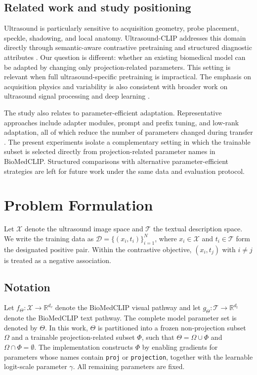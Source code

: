 \documentclass[runningheads]{llncs}
\begin{document}
\subsection{Related work and study positioning}

Ultrasound is particularly sensitive to acquisition geometry, probe placement, speckle, shadowing, and local anatomy. Ultrasound-CLIP addresses this domain directly through semantic-aware contrastive pretraining and structured diagnostic attributes \cite{jin2026usclip}. Our question is different: whether an existing biomedical model can be adapted by changing only projection-related parameters. This setting is relevant when full ultrasound-specific pretraining is impractical. The emphasis on acquisition physics and variability is also consistent with broader work on ultrasound signal processing and deep learning \cite{luijten2022ultrasound}.

The study also relates to parameter-efficient adaptation. Representative approaches include adapter modules, prompt and prefix tuning, and low-rank adaptation, all of which reduce the number of parameters changed during transfer \cite{houlsby2019adapters,lester2021prompt,li2021prefix,hu2022lora}. The present experiments isolate a complementary setting in which the trainable subset is selected directly from projection-related parameter names in BioMedCLIP. Structured comparisons with alternative parameter-efficient strategies are left for future work under the same data and evaluation protocol.

\section{Problem Formulation}

Let $\mathcal{X}$ denote the ultrasound image space and $\mathcal{T}$ the textual description space. We write the training data as $\mathcal{D}=\{(x_i,t_i)\}_{i=1}^{N}$, where $x_i\in\mathcal{X}$ and $t_i\in\mathcal{T}$ form the designated positive pair. Within the contrastive objective, $(x_i,t_j)$ with $i\neq j$ is treated as a negative association.


\subsection{Notation}
\label{lb-notion}
Let $f_{\Theta}:\mathcal{X}\rightarrow\mathbb{R}^{d_v}$ denote the BioMedCLIP visual pathway and let $g_{\Theta}:\mathcal{T}\rightarrow\mathbb{R}^{d_t}$ denote the BioMedCLIP text pathway. The complete model parameter set is denoted by $\Theta$. In this work, $\Theta$ is partitioned into a frozen non-projection subset $\Omega$ and a trainable projection-related subset $\Phi$, such that $\Theta=\Omega\cup\Phi$ and $\Omega\cap\Phi=\emptyset$. The implementation constructs $\Phi$ by enabling gradients for parameters whose names contain \texttt{proj} or \texttt{projection}, together with the learnable logit-scale parameter $\gamma$. All remaining parameters are fixed.
\end{document}
